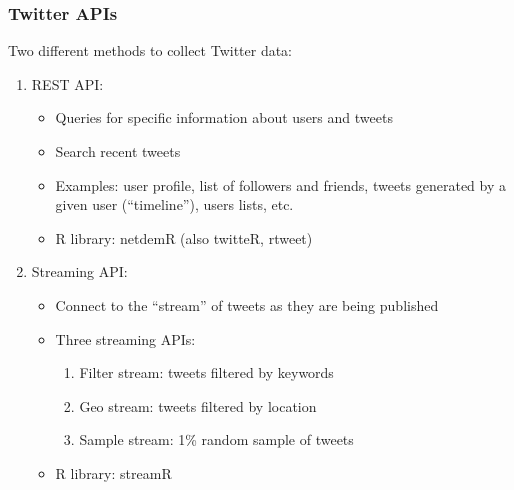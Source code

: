 \documentclass{beamer}
\begin{document}
\begin{frame}
	\frametitle{Twitter APIs}
	Two different methods to collect Twitter data:
	\begin{enumerate}[<+->]
		\item REST API:
		\begin{itemize}
			\item Queries for specific information about users and tweets
			\item Search recent tweets
			\item Examples: user profile, list of followers and friends, tweets generated by a given user (``timeline''), users lists, etc.
			\item R library: netdemR (also twitteR, rtweet)
		\end{itemize}
		\item Streaming API:
		\begin{itemize}
			\item Connect to the ``stream'' of tweets as they are being published
			\item Three streaming APIs:
			\begin{enumerate}
				\item Filter stream: tweets filtered by keywords
				\item Geo stream: tweets filtered by location
				\item Sample stream: 1\% random sample of tweets
			\end{enumerate}
			\item R library: streamR
		\end{itemize}
	\end{enumerate}
	
\end{frame}
\end{document}
